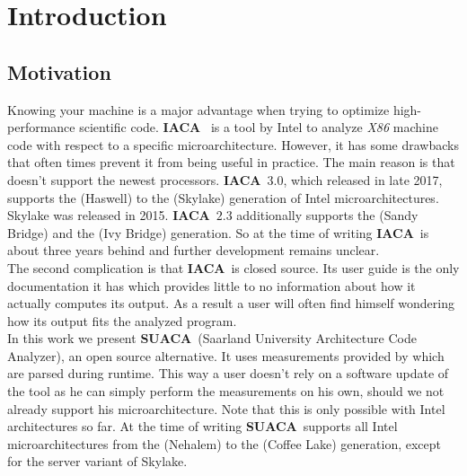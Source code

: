 \documentclass[a4paper,12pt,titlepage, twoside]{report}
\newcommand{\suaca}{\textbf{SUACA}}
\newcommand{\iaca}{\textbf{IACA}}
\begin{document}
\newpage
\thispagestyle{empty}
\mbox{}

\setcounter{page}{0}
\tableofcontents 



\chapter{Introduction}

\section{Motivation}

Knowing your machine is a major advantage when trying to optimize high-performance scientific code. \iaca\ \cite{iaca} is a tool by Intel to analyze \emph{X86} machine code with respect to a specific microarchitecture. However, it has some drawbacks that often times prevent it from being useful in practice. The main reason is that doesn't support the newest processors. \iaca\ $3.0$, which released in late 2017, supports the  (Haswell) to the  (Skylake) generation of Intel microarchitectures. Skylake was released in 2015. \iaca\ $2.3$ additionally supports the  (Sandy Bridge) and the  (Ivy Bridge) generation. So at the time of writing \iaca\ is about three years behind and further development remains unclear.\\
The second complication is that \iaca\ is closed source. Its user guide \cite{userguide} is the only documentation it has which provides little to no information about how it actually computes its output. As a result a user will often find himself wondering how its output fits the analyzed program.\\
In this work we present \suaca\ (Saarland University Architecture Code Analyzer), an open source alternative. It uses measurements provided by \cite{Andreas} which are parsed during runtime. This way a user doesn't rely on a software update of the tool as he can simply perform the measurements on his own, should we not already support his microarchitecture. Note that this is only possible with Intel architectures so far. At the time of writing \suaca\ supports all Intel microarchitectures from the  (Nehalem) to the  (Coffee Lake) generation, except for the server variant of Skylake.
\end{document}
